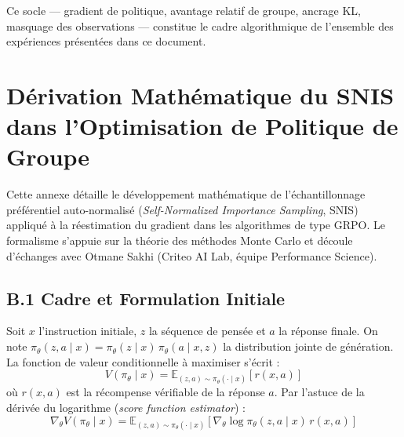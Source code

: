 \documentclass[11pt,a4paper]{article}
\begin{document}
Ce socle — gradient de politique, avantage relatif de groupe, ancrage KL, masquage des observations — constitue le cadre algorithmique de l'ensemble des expériences présentées dans ce document.










\newpage


\section{Dérivation Mathématique du SNIS dans l'Optimisation de Politique de Groupe}
\label{sec:annexe_snis}

Cette annexe détaille le développement mathématique de l'échantillonnage préférentiel auto-normalisé (\emph{Self-Normalized Importance Sampling}, SNIS) appliqué à la réestimation du gradient dans les algorithmes de type GRPO. Le formalisme s'appuie sur la théorie des méthodes Monte Carlo \cite[chap.~9]{owen2013montecarlo} et découle d'échanges avec Otmane Sakhi (Criteo AI Lab, équipe Performance Science).

\subsection*{B.1 Cadre et Formulation Initiale}
Soit $x$ l'instruction initiale, $z$ la séquence de pensée et $a$ la réponse finale. On note $\pi_\theta(z, a \mid x) = \pi_\theta(z \mid x)\, \pi_\theta(a \mid x, z)$ la distribution jointe de génération. La fonction de valeur conditionnelle à maximiser s'écrit :
\begin{equation}
V(\pi_\theta \mid x) = \mathbb{E}_{(z,a) \sim \pi_\theta(\cdot \mid x)} \left[ r(x,a) \right]
\end{equation}
où $r(x,a)$ est la récompense vérifiable de la réponse $a$. Par l'astuce de la dérivée du logarithme (\emph{score function estimator}) :
\begin{equation}
\nabla_\theta V(\pi_\theta \mid x) = \mathbb{E}_{(z,a) \sim \pi_\theta(\cdot \mid x)} \left[ \nabla_\theta \log \pi_\theta(z,a \mid x) \, r(x,a) \right]
\label{eq:snis_gradient_base}
\end{equation}
\end{document}
